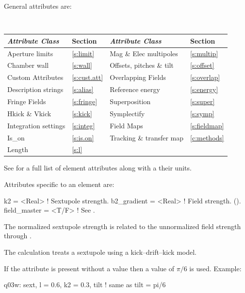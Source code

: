 {General  attributes are:
\begin{center}
\tt
\begin{tabular}{llll} \toprule
  {\sl Attribute Class}      & Section           & {\sl Attribute Class}      & Section           \\ \midrule
  Aperture limits            & \ref{s:limit}     & Mag \& Elec multipoles     & \ref{s:multip}    \\
  Chamber wall               & \ref{s:wall}      & Offsets, pitches \& tilt   & \ref{s:offset}    \\
  Custom Attributes          & \ref{s:cust.att}  & Overlapping Fields         & \ref{s:overlap}   \\
  Description strings        & \ref{s:alias}     & Reference energy           & \ref{s:energy}    \\ 
  Fringe Fields              & \ref{s:fringe}    & Superposition              & \ref{s:super}     \\
  Hkick \& Vkick             & \ref{s:kick}      & Symplectify                & \ref{s:symp}      \\
  Integration settings       & \ref{s:integ}     & Field Maps                 & \ref{s:fieldmap}  \\
  Is_on                      & \ref{s:is.on}     & Tracking \& transfer map   & \ref{c:methods}   \\ 
  Length                     & \ref{s:l}         &                            &                   \\ 
  \bottomrule
\end{tabular}
\end{center}
\toffset
See  for a full list of element attributes along with a their units.

Attributes specific to an  element are:
\begin{example}
  k2          = <Real>   ! Sextupole strength.
  b2_gradient = <Real>   ! Field strength. ().
  field_master = <T/F>    ! See .
\end{example}
The normalized sextupole  strength is related to the unnormalized  field
strength through .

The  calculation treats a sextupole using a kick--drift--kick model.

If the  attribute is present without a value then a value of 
$\pi/6$ is used.
Example:
\begin{example}
  q03w: sext, l = 0.6, k2 = 0.3, tilt  ! same as tilt = pi/6
\end{example}

}
